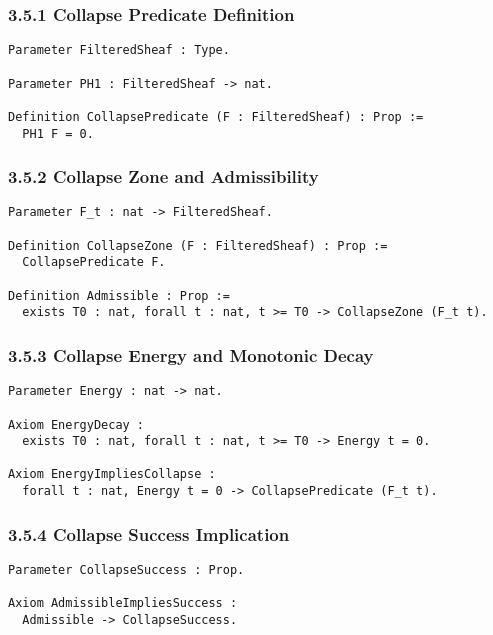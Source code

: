 \documentclass[11pt]{article}
\begin{document}
\subsubsection*{3.5.1 Collapse Predicate Definition}

\begin{lstlisting}[language=Coq, caption=Collapse Predicate, captionpos=b]
Parameter FilteredSheaf : Type.

Parameter PH1 : FilteredSheaf -> nat.

Definition CollapsePredicate (F : FilteredSheaf) : Prop :=
  PH1 F = 0.
\end{lstlisting}

\subsubsection*{3.5.2 Collapse Zone and Admissibility}

\begin{lstlisting}[language=Coq, caption=Collapse Zone Admissibility, captionpos=b]
Parameter F_t : nat -> FilteredSheaf.

Definition CollapseZone (F : FilteredSheaf) : Prop :=
  CollapsePredicate F.

Definition Admissible : Prop :=
  exists T0 : nat, forall t : nat, t >= T0 -> CollapseZone (F_t t).
\end{lstlisting}

\subsubsection*{3.5.3 Collapse Energy and Monotonic Decay}

\begin{lstlisting}[language=Coq, caption=Energy Decay and Collapse Guarantee, captionpos=b]
Parameter Energy : nat -> nat.

Axiom EnergyDecay :
  exists T0 : nat, forall t : nat, t >= T0 -> Energy t = 0.

Axiom EnergyImpliesCollapse :
  forall t : nat, Energy t = 0 -> CollapsePredicate (F_t t).
\end{lstlisting}

\subsubsection*{3.5.4 Collapse Success Implication}

\begin{lstlisting}[language=Coq, caption=From Admissibility to Collapse Success, captionpos=b]
Parameter CollapseSuccess : Prop.

Axiom AdmissibleImpliesSuccess :
  Admissible -> CollapseSuccess.
\end{lstlisting}
\end{document}
